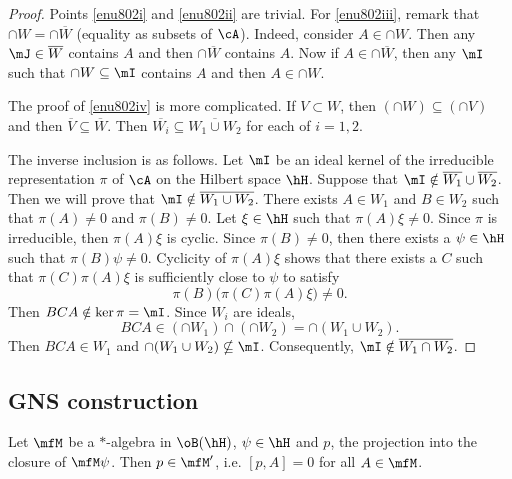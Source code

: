 \begin{proof}
Points \ref{enu802i}  and \ref{enu802ii} are trivial. For \ref{enu802iii}, remark that $\cap W=\cap\overline{ W }$ (equality as subsets of $\cA$). Indeed, consider $A\in\cap W$. Then any $\mJ\in\overline{ W }$ contains $A$ and then $\cap\overline{ W }$ contains $A$. Now if $A\in\cap\overline{ W }$, then any $\mI$ such that $\cap W\subseteq\mI$ contains $A$ and then $A\in\cap W$.
 
The proof of \ref{enu802iv} is more complicated. If $V\subset W$, then $(\cap W)\subseteq(\cap V)$ and then $\overline{ V }\subseteq\overline{ W }$. Then $\overline{ W_i }\subseteq\overline{ W_1\cup W_2 }$ for each of $i=1,2$.

The inverse inclusion is as follows. Let $\mI$ be an ideal kernel of the irreducible representation $\pi$ of $\cA$ on the Hilbert space $\hH$. Suppose that $\mI\notin \overline{ W_1 } \cup \overline{ W_2 }$. Then we will prove that $\mI\notin\overline{ W_1\cup W_2 }$. There exists $A\in W_1$ and $B\in W_2$ such that $\pi(A)\neq 0$ and $\pi(B)\neq0$. Let $\xi\in\hH$ such that $\pi(A)\xi\neq0$. Since $\pi$ is irreducible, then $\pi(A)\xi$ is cyclic. Since $\pi(B)\neq 0$, then there exists a $\psi\in\hH$ such that $\pi(B)\psi\neq0$. Cyclicity of $\pi(A)\xi$ shows that there exists a $C$ such that $\pi(C)\pi(A)\xi$ is sufficiently close to $\psi$ to satisfy
\[ 
  \pi(B)\big( \pi(C)\pi(A)\xi \big)\neq0.
\]
 Then $BCA\notin\ker\pi=\mI$. Since $W_i$ are ideals, 
\[ 
  BCA\in(\cap W_1)\cap(\cap W_2)=\cap(W_1\cup W_2). 
\]
Then $BCA\in W_1$ and $\cap(W_1\cup W_2)\nsubseteq\mI$. Consequently, $\mI\notin\overline{ W_1\cap W_2 }$.


\end{proof}


\subsection{GNS construction}

\begin{lemma}
Let $\mfM$ be a $*$-algebra in $\oB(\hH)$, $\psi\in\hH$ and $p$, the projection into the closure of $\mfM\psi$. Then $p\in\mfM'$, i.e. $[p,A]=0$ for all $A\in\mfM$.\label{lem_preGNS}
\end{lemma}

